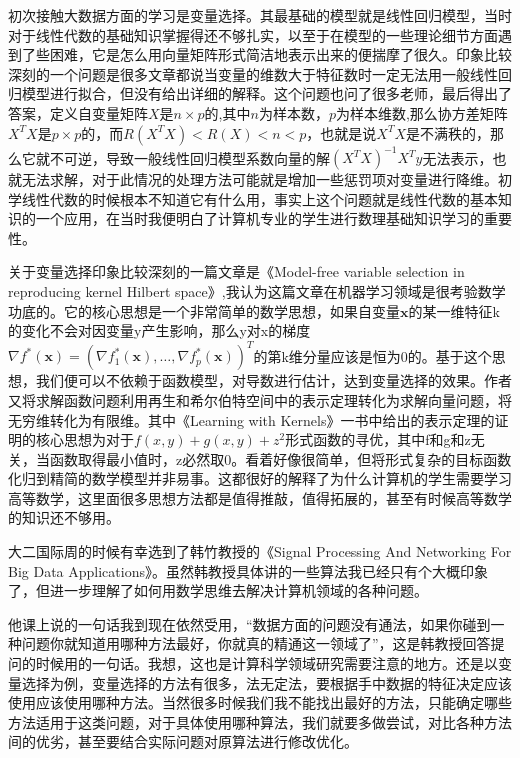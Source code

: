 \documentclass{article}
\begin{document}
\par
初次接触大数据方面的学习是变量选择。其最基础的模型就是线性回归模型，当时对于线性代数的基础知识掌握得还不够扎实，以至于在模型的一些理论细节方面遇到了些困难，它是怎么用向量矩阵形式简洁地表示出来的便揣摩了很久。印象比较深刻的一个问题是很多文章都说当变量的维数大于特征数时一定无法用一般线性回归模型进行拟合，但没有给出详细的解释。这个问题也问了很多老师，最后得出了答案，定义自变量矩阵$X$是$n\times p$的,其中$n$为样本数，$p$为样本维数,那么协方差矩阵$X^TX$是$p\times p$的，而$R\left(X^TX\right)<R\left(X\right)<n<p$，也就是说$X^TX$是不满秩的，那么它就不可逆，导致一般线性回归模型系数向量的解$\left(X^TX\right)^{-1}X^Ty$无法表示，也就无法求解，对于此情况的处理方法可能就是增加一些惩罚项对变量进行降维。初学线性代数的时候根本不知道它有什么用，事实上这个问题就是线性代数的基本知识的一个应用，在当时我便明白了计算机专业的学生进行数理基础知识学习的重要性。
\par
  关于变量选择印象比较深刻的一篇文章是《Model-free variable selection in reproducing kernel
Hilbert space》\citep{MF},我认为这篇文章在机器学习领域是很考验数学功底的。它的核心思想是一个非常简单的数学思想，如果自变量$\mathbf{x}$的某一维特征k的变化不会对因变量y产生影响，那么y对x的梯度$\nabla f^*(\mathbf{x})=\left(\nabla f_1^*(\mathbf{x}), \ldots, \nabla f_p^*(\mathbf{x})\right)^T$的第k维分量应该是恒为0的。基于这个思想，我们便可以不依赖于函数模型，对导数进行估计，达到变量选择的效果。作者又将求解函数问题利用再生和希尔伯特空间中的表示定理转化为求解向量问题，将无穷维转化为有限维。其中《Learning with Kernels》\citep{H}一书中给出的表示定理的证明的核心思想为对于$f\left(x,y\right)+g\left(x,y\right)+z^2$形式函数的寻优，其中f和g和z无关，当函数取得最小值时，z必然取0。看着好像很简单，但将形式复杂的目标函数化归到精简的数学模型并非易事。这都很好的解释了为什么计算机的学生需要学习高等数学，这里面很多思想方法都是值得推敲，值得拓展的，甚至有时候高等数学的知识还不够用。\par
大二国际周的时候有幸选到了韩竹教授的《Signal Processing And Networking For Big Data Applications》。虽然韩教授具体讲的一些算法我已经只有个大概印象了，但进一步理解了如何用数学思维去解决计算机领域的各种问题。\par
他课上说的一句话我到现在依然受用，“数据方面的问题没有通法，如果你碰到一种问题你就知道用哪种方法最好，你就真的精通这一领域了”，这是韩教授回答提问的时候用的一句话。我想，这也是计算科学领域研究需要注意的地方。还是以变量选择为例，变量选择的方法有很多，法无定法，要根据手中数据的特征决定应该使用应该使用哪种方法。当然很多时候我们我不能找出最好的方法，只能确定哪些方法适用于这类问题，对于具体使用哪种算法，我们就要多做尝试，对比各种方法间的优劣，甚至要结合实际问题对原算法进行修改优化。
\end{document}
